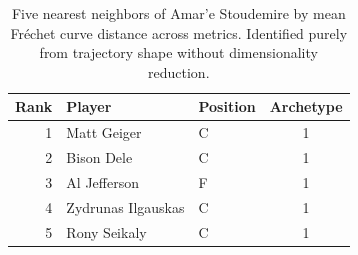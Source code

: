 \begin{table}[htbp]
  \centering\small
  \begin{tabular}{rllc}
    \toprule
    Rank & Player & Position & Archetype \\
    \midrule
    1 & Matt Geiger & C & 1 \\
    2 & Bison Dele & C & 1 \\
    3 & Al Jefferson & F & 1 \\
    4 & Zydrunas Ilgauskas & C & 1 \\
    5 & Rony Seikaly & C & 1 \\
    \bottomrule
  \end{tabular}
  \caption{Five nearest neighbors of Amar'e Stoudemire by mean Fr\'{e}chet curve distance across metrics. Identified purely from trajectory shape without dimensionality reduction.}
  \label{tab:Amar_e_Stoudemire_frechet_curve_neighbors}
\end{table}

